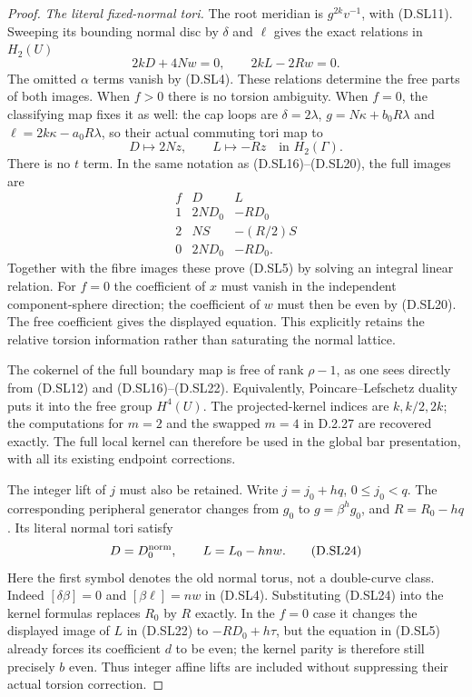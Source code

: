 \begin{proof}
\emph{The literal fixed-normal tori.}
The root meridian is $g^{2k}v^{-1}$,
with (D.SL11). Sweeping its bounding
normal disc by $\delta$ and $\ell$ gives
the exact relations in $H_2(U)$
\[
                 2kD+4Nw=0,\qquad
                             2kL-2Rw=0.                  \tag{D.SL21}
\]
The omitted $\alpha$ terms vanish by
(D.SL4). These relations determine the
free parts of both images. When $f>0$
there is no torsion ambiguity. When $f=0$,
the classifying map fixes it as well:
the cap loops are $\delta=2\lambda$,
$g=N\kappa+b_0R\lambda$ and
$\ell=2k\kappa-a_0R\lambda$, so their
actual commuting tori map to
\[
                 D\mapsto2Nz,\qquad L\mapsto-Rz
                            \quad\text{in }H_2(\Gamma).
\]
There is no $t$ term. In the same notation
as (D.SL16)--(D.SL20), the full images are
\[
\begin{array}{c|c|c}
f&D&L\\\hline
1&2ND_0&-RD_0\\
2&NS&-(R/2)S\\
0&2ND_0&-RD_0.
\end{array}                                               \tag{D.SL22}
\]
Together with the fibre images these
prove (D.SL5) by solving an integral
linear relation. For $f=0$ the coefficient
of $x$ must vanish in the independent
component-sphere direction; the coefficient
of $w$ must then be even by (D.SL20).
The free coefficient gives the displayed
equation. This explicitly retains the
relative torsion information rather than
saturating the normal lattice.

The cokernel of the full boundary map is
free of rank $\rho-1$, as one sees directly
from (D.SL12) and (D.SL16)--(D.SL22).
Equivalently, Poincare--Lefschetz duality
puts it into the free group $H^4(U)$.
The projected-kernel indices are $k,k/2,2k$;
the computations for $m=2$ and the swapped
$m=4$ in D.2.27 are recovered exactly.
The full local kernel can therefore be
used in the global bar presentation,
with all its existing endpoint corrections.

The integer lift of $j$ must also be retained.
Write $j=j_0+hq$, $0\le j_0<q$. The corresponding
peripheral generator changes from $g_0$ to
$g=\beta^h g_0$, and $R=R_0-hq$.
Its literal normal tori satisfy
\[
                    D=D_0^{\rm norm},\qquad
                    L=L_0-hn w.                           \tag{D.SL24}
\]
Here the first symbol denotes the old normal
torus, not a double-curve class. Indeed
$[\delta\beta]=0$ and $[\beta\ell]=nw$
in (D.SL4). Substituting (D.SL24) into
the kernel formulas replaces $R_0$ by
$R$ exactly. In the $f=0$ case it changes
the displayed image of $L$ in (D.SL22) to
$-RD_0+h\tau$, but the equation in
(D.SL5) already forces its coefficient
$d$ to be even; the kernel parity is
therefore still precisely $b$ even.
Thus integer affine lifts are included
without suppressing their actual torsion
correction.


\end{proof}
